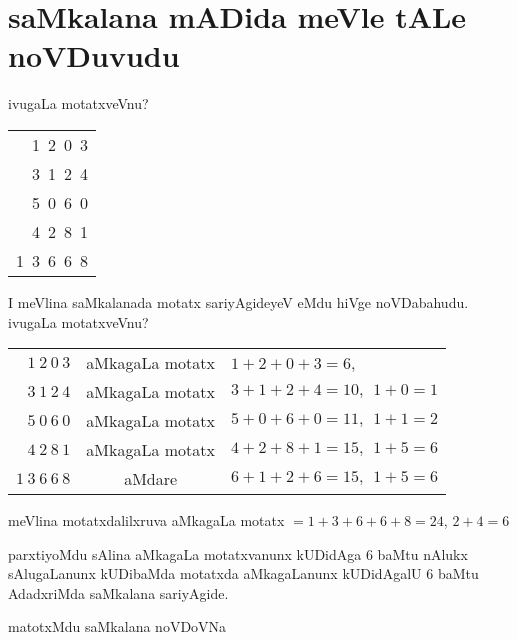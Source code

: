 \chapter{saMkalana mADida meVle tALe noVDuvudu}

\qquad ivugaLa motatxveVnu?

\begin{tabular}{r}
{\rm 1~2~0~3}\\
{\rm 3~1~2~4}\\
{\rm 5~0~6~0}\\
{\rm 4~2~8~1}\\\cline{1-1}
{\rm 1~3~6~6~8}
\end{tabular}

\smallskip

I meVlina saMkalanada motatx sariyAgideyeV eMdu hiVge noVDabahudu. ivugaLa motatxveVnu?

\smallskip

\begin{tabular}{rcl}
$1~ 2~ 0~  3$ & aMkagaLa motatx & $1+2+0+3=6$,\\
$3~1~2~4$ & aMkagaLa motatx & $3+1+2+4=10,~~ 1+0=1$\\
$5~0~6~0$ & aMkagaLa motatx & $5+0+6+0=11, ~~ 1+1=2$\\
$4~2~8~1$ & aMkagaLa motatx & $4+2+8+1=15, ~~ 1+5=6$\\\cline{1-1}
$1~3~6~6~8$ & aMdare & $6+1+2+6=15,~~ 1+5=6$ 
\end{tabular}

\smallskip

meVlina motatxdalilxruva aMkagaLa motatx $= 1+3+6+6+8=24$, $2+4=6$

parxtiyoMdu sAlina aMkagaLa motatxvanunx kUDidAga $6$ baMtu nAlukx sAlugaLanunx kUDibaMda motatxda aMkagaLanunx kUDidAgalU $6$ baMtu AdadxriMda saMkalana sariyAgide.



matotxMdu saMkalana noVDoVNa

\smallskip

{\fontsize{11}{13}}

